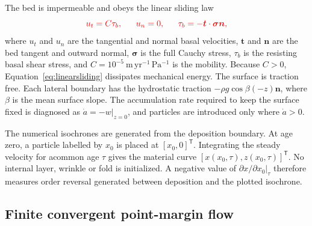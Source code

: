 \documentclass[review]{igs}
\providecommand{\DIFdel}[1]{{\protect\color{red} \scriptsize #1}} %
\providecommand{\DIFaddbegin}{} %
\providecommand{\DIFaddend}{} %
\providecommand{\DIFdelend}{} %
\newcommand{\DIFaddincludegraphics}[2][]{{\color{blue}\fbox{\DIFOincludegraphics[#1]{#2}}}} %
\DeclareRobustCommand{\DIFaddbegin}{\DIFOaddbegin \let\includegraphics\DIFaddincludegraphics} %
\DeclareRobustCommand{\DIFaddend}{\DIFOaddend \let\includegraphics\DIFOincludegraphics} %
\DeclareRobustCommand{\DIFdelend}{\DIFOaddend \let\includegraphics\DIFOincludegraphics} %
\begin{document}
\DIFdel{The bed is impermeable and obeys the linear sliding law
}\begin{displaymath}
\DIFdel{u_t=C\tau_b,
\qquad
u_n=0,
\qquad
\tau_b=-\bm{t}\mathbin{\cdot}\bm{\sigma}\bm{n},
}\end{displaymath}%
\DIFdel{where \(u_t\) and \(u_n\) are the tangential and normal basal velocities, \(\bm{t}\) and \(\bm{n}\) are the bed tangent and outward normal, \(\bm{\sigma}\) is the full Cauchy stress, \(\tau_b\) is the resisting basal shear stress, and \(C=10^{-5}~\mathrm{m\,yr^{-1}\,Pa^{-1}}\) is the mobility. Because \(C>0\), Equation~\ref{eq:linearsliding} dissipates mechanical energy. The surface is traction free. Each lateral boundary has the hydrostatic traction \(-\rho g\cos\beta(-z)\bm{n}\), where \(\beta\) is the mean surface slope. The accumulation rate required to keep the surface fixed is diagnosed as \(\dot a=-\left.w\right|_{z=0}\), and particles are introduced only where \(\dot a>0\). }%

\DIFdel{The numerical isochrones are generated from the deposition boundary.
At age zero, a particle labelled by \(x_0\) is placed at \([x_0,0]^{\mathsf T}\). Integrating the steady velocity for acommon age \(\tau\) gives the material curve \([x(x_0,\tau),z(x_0,\tau)]^{\mathsf T}\). No internal layer, wrinkle or fold is initialized. A negative value of \(\left.\partial x/\partial x_0\right|_\tau\) therefore measures order reversal generated between deposition and the plotted isochrone. }\DIFdelend \DIFaddbegin \subsection{Finite convergent point-margin flow}
\DIFaddend 
\end{document}
